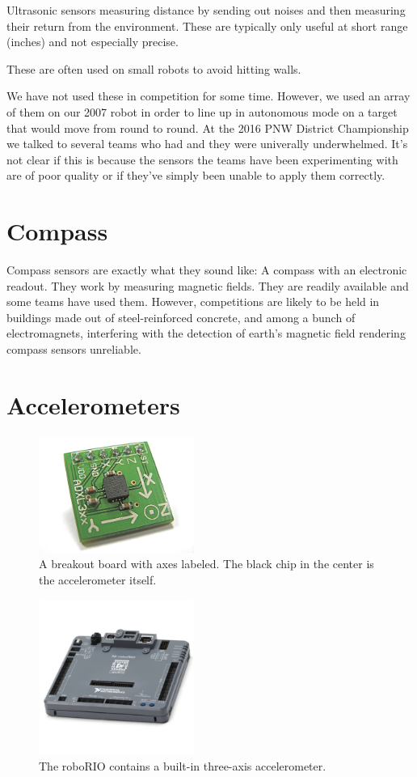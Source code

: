 \documentclass{article}
\begin{document}
Ultrasonic sensors measuring distance by sending out noises and then measuring their return from the environment.  These are typically only useful at short range (inches) and not especially precise.  

These are often used on small robots to avoid hitting walls.  

We have not used these in competition for some time.  However, we used an array of them on our 2007 robot in order to line up in autonomous mode on a target that would move from round to round.  At the 2016 PNW District Championship we talked to several teams who had and they were univerally underwhelmed.  It's not clear if this is because the sensors the teams have been experimenting with are of poor quality or if they've simply been unable to apply them correctly.

\section{Compass}

Compass sensors are exactly what they sound like: A compass with an electronic readout.  They work by measuring magnetic fields.  They are readily available and some teams have used them.  However, competitions are likely to be held in buildings made out of steel-reinforced concrete, and among a bunch of electromagnets, interfering with the detection of earth's magnetic field rendering compass sensors unreliable.

\section{Accelerometers}
\begin{figure}[ht]
\centering
\includegraphics[width=2in]{accelerometer.jpg}
\caption{A breakout board with axes labeled.  The black chip in the center is the accelerometer itself.}
\end{figure}

\begin{figure}[ht]
\centering
\includegraphics[width=2in]{roborio.jpg}
\caption{The roboRIO contains a built-in three-axis accelerometer.}
\end{figure}
\end{document}
